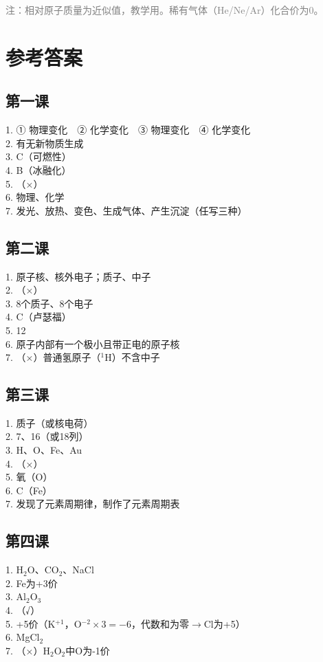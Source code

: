 \documentclass[a4paper,12pt]{ctexart}
\begin{document}
\vspace{0.3cm}
\textcolor{gray}{\small 注：相对原子质量为近似值，教学用。稀有气体（He/Ne/Ar）化合价为0。}

\newpage
\section*{\textcolor{defblue}{参考答案}}

\subsection*{第一课}
1. ① 物理变化　② 化学变化　③ 物理变化　④ 化学变化\\
2. 有无新物质生成\\
3. C（可燃性）\\
4. B（冰融化）\\
5. （×）\\
6. 物理、化学\\
7. 发光、放热、变色、生成气体、产生沉淀（任写三种）

\subsection*{第二课}
1. 原子核、核外电子；质子、中子\\
2. （×）\\
3. 8个质子、8个电子\\
4. C（卢瑟福）\\
5. 12\\
6. 原子内部有一个极小且带正电的原子核\\
7. （×）普通氢原子（$^1$H）不含中子

\subsection*{第三课}
1. 质子（或核电荷）\\
2. 7、16（或18列）\\
3. H、O、Fe、Au\\
4. （×）\\
5. 氧（O）\\
6. C（Fe）\\
7. 发现了元素周期律，制作了元素周期表

\subsection*{第四课}
1. H$_2$O、CO$_2$、NaCl\\
2. Fe为+3价\\
3. Al$_2$O$_3$\\
4. （√）\\
5. +5价（K$^{+1}$，O$^{-2}\times3=-6$，代数和为零$\rightarrow$Cl为+5）\\
6. MgCl$_2$\\
7. （×）H$_2$O$_2$中O为-1价
\end{document}
